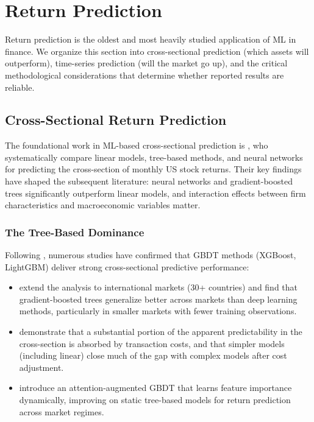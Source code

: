 \section{Return Prediction}\label{sec:return_prediction}

Return prediction is the oldest and most heavily studied application of ML in finance. We organize this section into cross-sectional prediction (which assets will outperform), time-series prediction (will the market go up), and the critical methodological considerations that determine whether reported results are reliable.

\subsection{Cross-Sectional Return Prediction}

The foundational work in ML-based cross-sectional prediction is \citet{Gu2020}, who systematically compare linear models, tree-based methods, and neural networks for predicting the cross-section of monthly US stock returns. Their key findings have shaped the subsequent literature: neural networks and gradient-boosted trees significantly outperform linear models, and interaction effects between firm characteristics and macroeconomic variables matter.

\subsubsection{The Tree-Based Dominance}

Following \citet{Gu2020}, numerous studies have confirmed that GBDT methods (XGBoost, LightGBM) deliver strong cross-sectional predictive performance:

\begin{itemize}[leftmargin=*]
    \item \citet{Leippold2022} extend the analysis to international markets (30+ countries) and find that gradient-boosted trees generalize better across markets than deep learning methods, particularly in smaller markets with fewer training observations.

    \item \citet{Tobek2021} demonstrate that a substantial portion of the apparent predictability in the cross-section is absorbed by transaction costs, and that simpler models (including linear) close much of the gap with complex models after cost adjustment.

    \item \citet{Chen2024} introduce an attention-augmented GBDT that learns feature importance dynamically, improving on static tree-based models for return prediction across market regimes.
\end{itemize}


